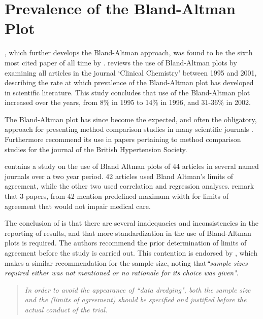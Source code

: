 \documentclass[12pt, a4paper]{report}
\theoremstyle{plain}
\theoremstyle{definition}
\theoremstyle{remark}
\begin{document}
\section{Prevalence of the Bland-Altman Plot}

\citet*{BA86}, which further develops the Bland-Altman approach,
was found to be the sixth most cited paper of all time by \citet{BAcite}. \cite{Dewitte} reviews the use of Bland-Altman plots by examining all articles in the journal `Clinical Chemistry' between 1995 and 2001, describing the rate at which
prevalence of the Bland-Altman plot has developed in scientific
literature. This study concludes that use of the Bland-Altman plot increased over the years, from 8\% in 1995 to
14\% in 1996, and 31-36\% in 2002.

The Bland-Altman plot has since become the expected, and often the obligatory, approach for presenting method comparison
studies in many scientific journals \citep{hollis}. Furthermore \citet{BritHypSoc} recommend its use in papers pertaining to
method comparison studies for the journal of the British Hypertension Society.


\citet{mantha} contains a study on the use of Bland Altman plots of 44 articles in several named journals over a two year period. 42 articles used Bland Altman's limits of agreement, while the other two used correlation and regression analyses. \citet{mantha} remark that 3 papers, from 42 mention predefined maximum width for limits of agreement that would not impair medical care.

The conclusion of \citet{mantha} is that there are several inadequacies and inconsistencies in the reporting of results, and
that more standardization in the use of Bland-Altman plots is required. The authors recommend the prior determination of limits of agreement before the study is carried out. This contention is endorsed by \citet{lin}, which makes a similar recommendation for the sample size, noting that\emph{``sample sizes required either was not mentioned or no rationale for its choice was given"}.

\begin{quote}
\textit{In order to avoid the appearance of ``data dredging", both the
	sample size and the (limits of agreement) should be specified and
	justified before the actual conduct of the trial.} \citep{lin}
\end{quote}
\end{document}
